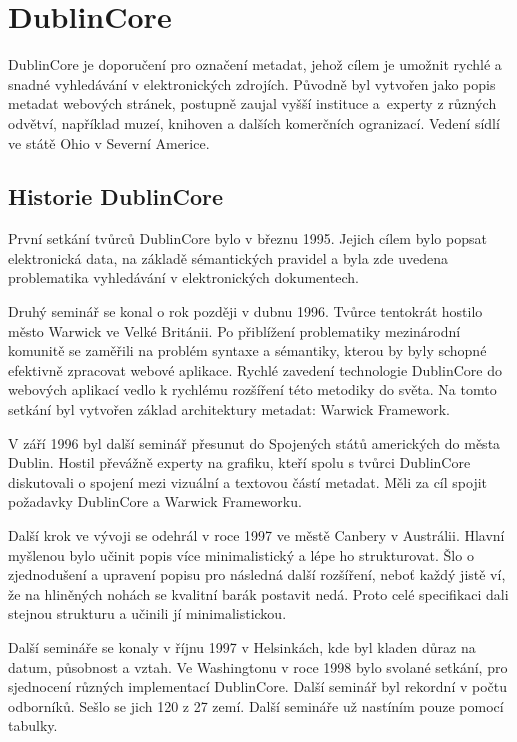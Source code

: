 \section{DublinCore}
\par DublinCore\cite{dublincoredocementation} je doporučení pro označení metadat, jehož cílem je umožnit rychlé a snadné vyhledávání v elektronických zdrojích. Původně byl vytvořen jako popis metadat webových stránek, postupně zaujal vyšší instituce a~experty z různých odvětví, například muzeí, knihoven a dalších komerčních ogranizací. Vedení sídlí ve státě Ohio v Severní Americe.

\subsection{Historie DublinCore}
\par První setkání tvůrců DublinCore\cite{dublincoredocementation} bylo v březnu 1995. Jejich cílem bylo popsat elektronická data, na základě sémantických pravidel a byla zde uvedena problematika vyhledávání v elektronických dokumentech.

\par Druhý seminář se konal o rok později v dubnu 1996. Tvůrce tentokrát hostilo město Warwick ve Velké Británii. Po přiblížení problematiky mezinárodní komunitě se zaměřili na problém syntaxe a sémantiky, kterou by byly schopné efektivně zpracovat webové aplikace. Rychlé zavedení technologie DublinCore do webových aplikací vedlo k rychlému rozšíření této metodiky do světa. Na tomto setkání byl vytvořen základ architektury metadat: Warwick Framework.

\par V září 1996 byl další seminář přesunut do Spojených států amerických do města Dublin. Hostil převážně experty na grafiku, kteří spolu s tvůrci DublinCore diskutovali o spojení mezi vizuální a textovou částí metadat. Měli za cíl spojit požadavky DublinCore a Warwick Frameworku.

\par Další krok ve vývoji se odehrál v roce 1997 ve městě Canbery v Austrálii. Hlavní myšlenou bylo učinit popis více minimalistický a lépe ho strukturovat. Šlo o zjednodušení a upravení popisu pro následná další rozšíření, neboť každý jistě ví, že na hliněných nohách se kvalitní barák postavit nedá. Proto celé specifikaci dali stejnou strukturu a učinili jí minimalistickou.

\par Další semináře se konaly v říjnu 1997 v Helsinkách, kde byl kladen důraz na datum, působnost a vztah. Ve Washingtonu v roce 1998 bylo svolané setkání, pro sjednocení různých implementací DublinCore. Další seminář byl rekordní v počtu odborníků. Sešlo se jich 120 z 27 zemí. Další semináře už nastíním pouze pomocí tabulky.

